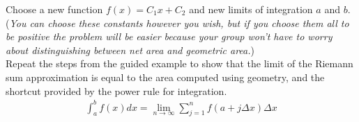 \documentclass{ximera}
\begin{document}
\begin{exercise}    
    Choose a new function $f(x) = C_{1}x + C_{2}$ and new limits of integration $a$ and $b$. (\textit{You can choose these constants however you wish, but if you choose them all to be positive the problem will be easier because your group won't have to worry about distinguishing between net area and geometric area.})\\

    Repeat the steps from the guided example to show that the limit of the Riemann sum approximation is equal to the area computed using geometry, and the shortcut provided by the power rule for integration.\\

\begin{align}
	\int_{a}^b f(x) dx = \lim_{n\rightarrow \infty} \sum_{j=1}^n f(a + j\Delta x) \Delta x \nonumber
\end{align}
\end{exercise}
\end{document}

